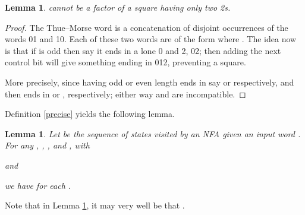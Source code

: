 \documentclass[12pt]{article}
\theoremstyle{plain}
\newtheorem{lem}[thm]{Lemma}
\theoremstyle{definition}
\theoremstyle{remark}
\begin{document}
			\begin{lem}\label{thue}
				 cannot be a factor of a square having only two 2s.
			\end{lem}
			\begin{proof}
				The Thue--Morse word is a concatenation of disjoint occurrences of the words 01 and 10.
				Each of these two words are of the form  where .
				The idea now is that if  is odd then say it ends in a lone 0 and 2, 02;
				then adding the next control bit will give something ending in 012, preventing a square.

				More precisely, since  having odd or even length ends in say
				 or  respectively,
				and then  ends in  or , respectively;
				either way  and  are incompatible.
			\end{proof}

			Definition \ref{precise} yields the following lemma.
			\begin{lem}\label{precisedef}
				Let  be the sequence of states visited by an NFA  given an input word .
				For any , , , and ,  with
				
				and
				
				we have  for each .
			\end{lem}
			Note that in Lemma \ref{precisedef}, it may very well be that .
\end{document}
